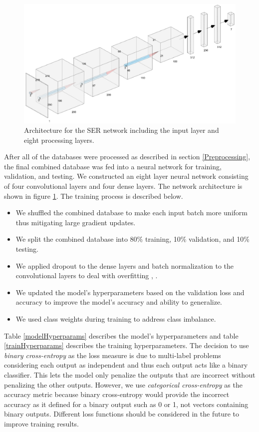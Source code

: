 \documentclass[a4paper, 10pt, conference]{ieeeconf}      %
\begin{document}
\begin{figure}
	\centering
	\hspace{6mm}
	\includegraphics[width=\linewidth]{neural_network_architecture.png}
	\caption{Architecture for the SER network including the input layer and eight processing layers.}
	\label{neuralNetworkArchitecture}
\end{figure}

After all of the databases were processed as described in section \ref{Preprocessing}, the final combined database was fed into a neural network for training, validation, and testing. We constructed an eight layer neural network consisting of four convolutional layers and four dense layers. The network architecture is shown in figure \ref{neuralNetworkArchitecture}. The training process is described below.
\begin{itemize}
	\item We shuffled the combined database to make each input batch more uniform thus mitigating large gradient updates.
	\item We split the combined database into 80\% training, 10\% validation, and 10\% testing.
	\item We applied dropout to the dense layers and batch normalization to the convolutional layers to deal with overfitting \cite{Srivastava2014}, \cite{Ioffe2015}.
	\item We updated the model's hyperparameters based on the validation loss and accuracy to improve the model's accuracy and ability to generalize.
	\item We used class weights during training to address class imbalance.
\end{itemize}

Table \ref{modelHyperparams} describes the model's hyperparameters and table \ref{trainHyperparams} describes the training hyperparameters. The decision to use \textit{binary cross-entropy} as the loss measure is due to multi-label problems considering each output as independent and thus each output acts like a binary classifier. This lets the model only penalize the outputs that are incorrect without penalizing the other outputs. However, we use \textit{categorical cross-entropy} as the accuracy metric because binary cross-entropy would provide the incorrect accuracy as it defined for a binary output such as 0 or 1, not vectors containing binary outputs. Different loss functions should be considered in the future to improve training results.
\end{document}
